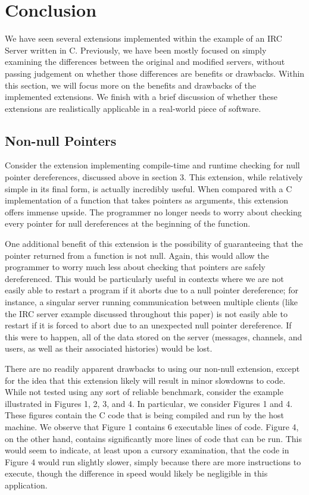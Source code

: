 \documentclass[main.tex]{subfiles}
\begin{document}
\section{Conclusion}
We have seen several extensions implemented within the example of an IRC Server written in C. Previously, we have been
mostly focused on simply examining the differences between the original and modified servers, without passing judgement on
whether those differences are benefits or drawbacks. Within this section, we will focus more on the benefits and drawbacks of
the implemented extensions. We finish with a brief discussion of whether these extensions are realistically applicable in a
real-world piece of software.

\subsection{Non-null Pointers}
Consider the extension implementing compile-time and runtime checking for null pointer dereferences, discussed above in section 3.
This extension, while relatively simple in its final form, is actually incredibly useful. When compared with a C implementation of
a function that takes pointers as arguments, this extension offers immense upside. The programmer no longer needs to worry
about checking every pointer for null dereferences at the beginning of the function.

One additional benefit of this extension is the possibility of guaranteeing that the pointer returned from a function is not null.
Again, this would allow the programmer to worry much less about checking that pointers are safely dereferenced. This would
be particularly useful in contexts where we are not easily able to restart a program if it aborts due to a null pointer 
dereference; for instance, a singular server running communication between multiple clients (like the IRC server example
discussed throughout this paper) is not easily able to restart if it is forced to abort due to an unexpected null pointer
dereference. If this were to happen, all of the data stored on the server (messages, channels, and users, as well as their
associated histories) would be lost.

There are no readily apparent drawbacks to using our non-null extension, except for the idea that this extension likely will
result in minor slowdowns to code. While not tested using any sort of reliable benchmark, consider the example illustrated
in Figures 1, 2, 3, and 4. In particular, we consider Figures 1 and 4. These figures contain the C code that is being compiled and
run by the host machine. We observe that Figure 1 contains 6 executable lines of code. Figure 4, on the other hand, contains
significantly more lines of code that can be run. This would seem to indicate, at least upon a cursory examination, that the code in
Figure 4 would run slightly slower, simply because there are more instructions to execute, though the difference in speed would
likely be negligible in this application.
\end{document}
